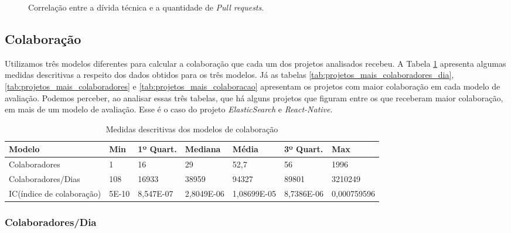 \begin{figure}[H]
  \centering
  \caption{Correlação entre a dívida técnica e a quantidade de \textit{Pull requests}.}
  \label{fig:correlacao_divida_pull_request} 
\end{figure}



\subsection{Colaboração}

Utilizamos três modelos diferentes para calcular a colaboração que cada um dos projetos analisados recebeu. A Tabela \ref{tab:medidas_descritivas_colaboracao} apresenta algumas medidas descritivas a respeito dos dados obtidos para os três modelos.  Já as tabelas \ref{tab:projetos_mais_colaboradores_dia}, \ref{tab:projetos_mais_colaboradores} e \ref{tab:projetos_mais_colaboracao} apresentam os projetos com maior colaboração em cada modelo de avaliação. Podemos perceber, ao analisar essas três tabelas, que há alguns projetos que figuram entre os que receberam maior colaboração, em mais de um modelo de avaliação. Esse é o caso do projeto \textit{ElasticSearch} e \textit{React-Native}.

\begin{table}[H]
\begin{tabular}{|l|l|l|l|l|l|l|}
\hline
\textbf{Modelo}           & \textbf{Min} & \textbf{1º Quart.} & \textbf{Mediana} & \textbf{Média} & \textbf{3º Quart.} & \textbf{Max} \\ \hline
Colaboradores             & 1            & 16                 & 29               & 52,7           & 56                 & 1996         \\ \hline
Colaboradores/Dias        & 108          & 16933              & 38959            & 94327          & 89801              & 3210249      \\ \hline
IC(índice de colaboração) & 5E-10        & 8,547E-07          & 2,8049E-06       & 1,08699E-05    & 8,7386E-06         & 0,000759596  \\ \hline
\end{tabular}
\caption{Medidas descritivas dos modelos de colaboração}
\label{tab:medidas_descritivas_colaboracao}
\end{table}

\subsubsection{Colaboradores/Dia}

